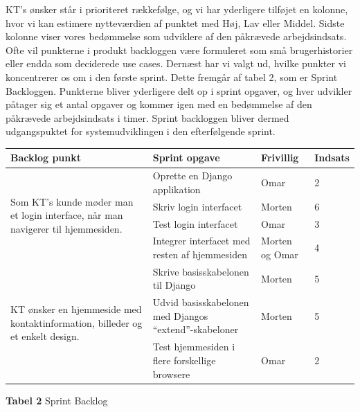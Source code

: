 \documentclass[12pt]{article}   %
\begin{document}
KT's ønsker står i prioriteret rækkefølge, og vi har yderligere tilføjet en
kolonne, hvor vi kan estimere nytteværdien af punktet med Høj, Lav eller
Middel. Sidste kolonne viser vores bedømmelse som udviklere af den påkrævede
arbejdsindsats. Ofte vil punkterne i produkt backloggen være formuleret som
små brugerhistorier eller endda som deciderede use cases. Dernæst har vi
valgt ud, hvilke punkter vi koncentrerer os om i den første sprint. Dette
fremgår af tabel 2, som er Sprint Backloggen. Punkterne bliver yderligere
delt op i sprint opgaver, og hver udvikler påtager sig et antal opgaver og
kommer igen med en bedømmelse af den påkrævede arbejdsindsats i timer. Sprint
backloggen bliver dermed udgangspuktet for systemudviklingen i den
efterfølgende sprint. 


\begin{center}
	\begin{tabular}{|l|p{4cm}|l|l|}
		\hline
		Backlog punkt & Sprint opgave & Frivillig & Indsats\\ \hline
		\multirow{4}{4cm}{Som KT's kunde møder man et login interface,
		når man navigerer til hjemmesiden.} & Oprette en Django
		applikation & Omar  & 2 \\
		& Skriv login interfacet & Morten & 6 \\
		& Test login interfacet & Omar & 3 \\
		& Integrer interfacet med resten af hjemmesiden & Morten og Omar
		& 4 \\ \hline
		\multirow{3}{4cm}{KT ønsker en hjemmeside med
		kontaktinformation, billeder og et enkelt design.} &
		Skrive basisskabelonen til Django & Morten & 5 \\
		& Udvid basisskabelonen med Djangos ``extend''-skabeloner & Morten & 5
		\\ & Test hjemmesiden i flere forskellige browsere & Omar & 2 \\
		\hline

	\end{tabular}
\end{center}

\begin{center}
\textbf{Tabel 2} Sprint Backlog
\end{center}

\vspace{0.5cm}
\end{document}
